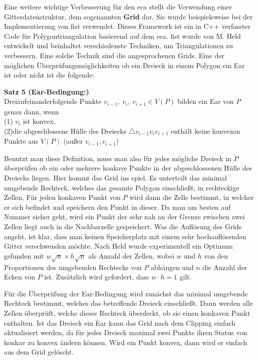 Eine weitere wichtige Verbesserung für den \ac{eca} stellt die Verwendung einer Gitterdatenstruktur, dem sogenannten \textbf{Grid} dar. Sie wurde beispielsweise bei der Implementierung von \ac{fist} verwendet. 
Dieses Framework ist ein in C++ verfasster Code für Polygontriangulation basierend auf dem \ac{eca}.\cite{paralleleca} \ac{fist} wurde von M. Held entwickelt und beinhaltet verschiedenste Techniken, um Triangulationen zu verbessern.\cite{fist}
Eine solche Technik sind die angesprochenen Grids. Eine der möglichen Überprüfungsmöglichkeiten ob ein Dreieck in einem Polygon ein Ear ist oder nicht ist die folgende:

\begin{flushleft}
    \begin{tabbing}
    \textbf{Satz 5 (Ear-Bedingung:)\cite{fist}}
    \\
    Drei\= aufeinanderfolgende Punkte $v_{i-1},~v_i,~v_{i+1} \in V(P)$ bilden ein Ear von $P$\\
    genau dann, wenn\\
    
    (1)\> $v_i$ ist konvex,\\
    (2)\>die abgeschlossene Hülle des Dreiecks $\triangle v_{i-1}v_iv_{i+1}$ enthält keine konvexen\\
        \> Punkte aus $V(P)$ (außer $v_{i-1}, v_{i+1}$)
    \end{tabbing}
  \end{flushleft}

Benutzt man diese Definition, muss man also für jedes mögliche Dreieck in $P$ überprüfen ob ein oder mehrere konkave Punkte in der abgeschlossenen Hülle des Dreiecks liegen.
Hier kommt das Grid ins spiel. Es unterteilt das minimal umgebende Rechteck, welches das gesamte Polygon einschließt, in rechteckige Zellen. Für jeden konkaven Punkt von $P$ wird dann die Zelle bestimmt, in welcher er sich befindet und speichern den Punkt in dieser.
Da man am besten auf Nummer sicher geht, wird ein Punkt der sehr nah an der Grenze zwischen zwei Zellen liegt auch in die Nachbarzelle gespeichert. Was die Auflösung des Grids angeht, ist klar, dass man keinen Speicherplatz mit einem sehr hochauflösenden Gitter verschwenden möchte.
Nach Held wurde experimentell ein Optimum gefunden mit $w \sqrt{n} \times h \sqrt{n}$ als Anzahl der Zellen, wobei $w$ und $h$ von den Proportionen des umgebenden Rechtecks von $P$ abhängen und $n$ die Anzahl der Ecken von $P$ ist.
Zusätzlich wird gefordert, dass $w \cdot h = 1$ gilt.

Für die Überprüfung der Ear-Bedingung wird zunächst das minimal umgebende Rechteck bestimmt, welches das betreffende Dreieck einschließt. Dann werden alle Zellen überprüft, welche dieses Rechteck überdeckt, ob sie einen konkaven Punkt enthalten.
Ist das Dreieck ein Ear kann das Grid nach dem Clipping einfach aktualisiert werden, da für jedes Dreieck maximal zwei Punkte ihren Status von konkav zu konvex ändern können. Wird ein Punkt konvex, dann wird er einfach aus dem Grid gelöscht.

